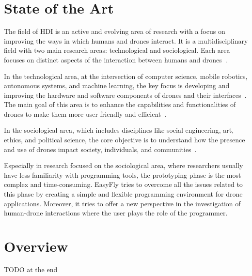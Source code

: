\section{State of the Art}\label{sec:intro_soa}
The field of HDI is an active and evolving area of research with a focus on improving the ways in which humans
and drones interact. It is a multidisciplinary field with two main research areas: technological and sociological.
Each area focuses on distinct aspects of the interaction between humans and drones~\cite{hri2009davidMaya}.

In the technological area, at the intersection of computer science, mobile robotics, autonomous systems, and machine learning,
the key focus is developing and improving the hardware and software components of drones and their interfaces~\cite{kolling2012towards, giusti2012distributed}.
The main goal of this area is to enhance the capabilities and functionalities of drones to make them more user-friendly and efficient~\cite{cauchard2015droneAndMe}.

In the sociological area, which includes disciplines like social engineering, art, ethics, and political science,
the core objective is to understand how the presence and use of drones impact society, individuals, and communities~\cite{eriksson2020ethicsInMovement, anderson2012accidentally}.

Especially in research focused on the sociological area, where researchers usually have less familiarity with programming tools, 
the prototyping phase is the most complex and time-consuming. 
EasyFly tries to overcome all the issues related to this phase by creating a simple and flexible programming environment for drone applications.
Moreover, it tries to offer a new perspective in the investigation of human-drone interactions where the user plays the role of the programmer.

\section{Overview}\label{sec:intro_overview}

TODO at the end